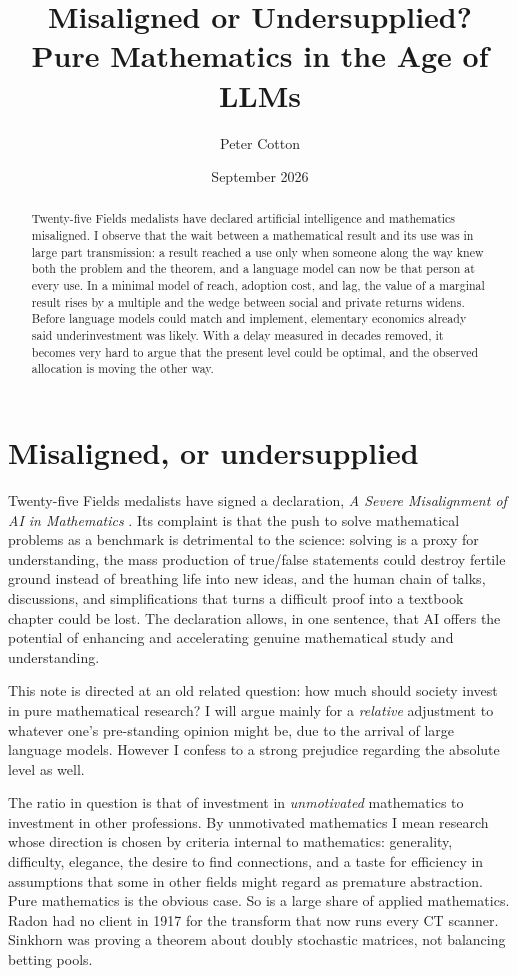 \documentclass[11pt]{article}
\title{\textbf{Misaligned or Undersupplied?\\ Pure Mathematics in the Age of LLMs}}
\author{Peter Cotton}
\date{September 2026}
\theoremstyle{definition}
\theoremstyle{remark}
\begin{document}
\maketitle

\begin{abstract}
Twenty-five Fields medalists have declared artificial intelligence and mathematics misaligned. I observe that the wait between a mathematical result and its use was in large part transmission: a result reached a use only when someone along the way knew both the problem and the theorem, and a language model can now be that person at every use. In a minimal model of reach, adoption cost, and lag, the value of a marginal result rises by a multiple and the wedge between social and private returns widens. Before language models could match and implement, elementary economics already said underinvestment was likely. With a delay measured in decades removed, it becomes very hard to argue that the present level could be optimal, and the observed allocation is moving the other way.
\end{abstract}

\section{Misaligned, or undersupplied}

Twenty-five Fields medalists have signed a declaration, \emph{A Severe Misalignment of AI in Mathematics} \citep{avila2026}. Its complaint is that the push to solve mathematical problems as a benchmark is detrimental to the science: solving is a proxy for understanding, the mass production of true/false statements could destroy fertile ground instead of breathing life into new ideas, and the human chain of talks, discussions, and simplifications that turns a difficult proof into a textbook chapter could be lost. The declaration allows, in one sentence, that AI offers the potential of enhancing and accelerating genuine mathematical study and understanding.

This note is directed at an old related question: how much should society invest in pure mathematical research? I will argue mainly for a {\em relative} adjustment to whatever one's pre-standing opinion might be, due to the arrival of large language models. However I confess to a strong prejudice regarding the absolute level as well.

The ratio in question is that of investment in {\em unmotivated} mathematics to investment in other professions. By unmotivated mathematics I mean research whose direction is chosen by criteria internal to mathematics: generality, difficulty, elegance, the desire to find connections, and a taste for efficiency in assumptions that some in other fields might regard as premature abstraction. Pure mathematics is the obvious case. So is a large share of applied mathematics. Radon had no client in 1917 for the transform that now runs every CT scanner. Sinkhorn was proving a theorem about doubly stochastic matrices, not balancing betting pools.
\end{document}
